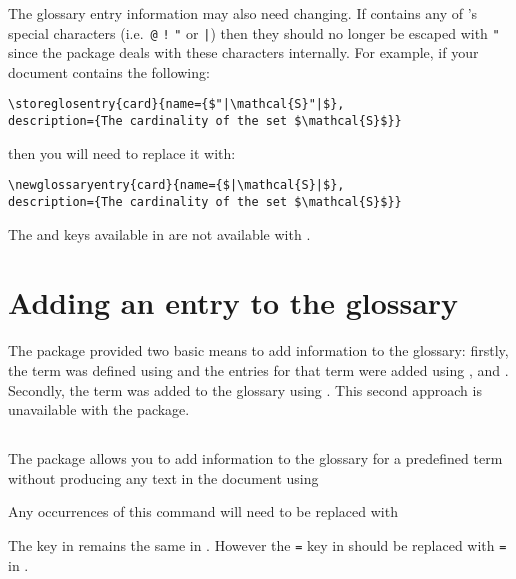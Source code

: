 \documentclass{nlctdoc}
\newenvironment{oldway}{%
  \begin{labelledbox}{\styfmt{glossary}}\ttfamily\obeylines
}{%
  \end{labelledbox}%
}
\newenvironment{newway}{%
  \begin{labelledbox}{\styfmt{glossaries}}\ttfamily\obeylines
}{%
  \end{labelledbox}%
}
\begin{document}
The glossary entry information  may also need 
changing. If  contains any of 's 
special characters (i.e.\ \texttt{@} \texttt{!} \verb|"| or
\verb"|") then they should no longer be escaped with \verb'"'
since the  package deals with these characters
internally. For example, if your document contains the following:
\begin{verbatim}
\storeglosentry{card}{name={$"|\mathcal{S}"|$},
description={The cardinality of the set $\mathcal{S}$}}
\end{verbatim}
then you will need to replace it with:
\begin{verbatim}
\newglossaryentry{card}{name={$|\mathcal{S}|$},
description={The cardinality of the set $\mathcal{S}$}}
\end{verbatim}

The  and
 keys available in 
are not available with .

\section{Adding an entry to the glossary}

The  package provided two basic means to add
information to the glossary: firstly, the term was defined
using  and the entries for that term were
added using ,  and .
Secondly, the term was added to the glossary using .
This second approach is unavailable with the 
package.

\subsection{\texorpdfstring{}{\textbackslash
useglosentry}}
\label{sec:useglosentry}

The  package allows you to add information to the
glossary for a predefined term without producing any text in the
document using
\begin{oldway}
\end{oldway}%
Any occurrences of this command will need to be replaced with
\begin{newway}
\end{newway}%
The  key in  remains
the same in . However the
\texttt{=} key in
 should be replaced with
\texttt{=} in .
\end{document}
